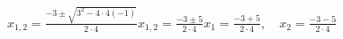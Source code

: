 \documentclass[preview]{standalone}
\begin{document}
\begin{align*}
x_{1,2} = \frac{-3 \pm \sqrt{3^2 - 4 \cdot 4(-1)}}{2 \cdot 4} x_{1,2} = \frac{-3 \pm 5}{2 \cdot 4} x_1 = \frac{-3 + 5}{2 \cdot 4}, \quad x_2 = \frac{-3 - 5}{2 \cdot 4}
\end{align*}
\end{document}
